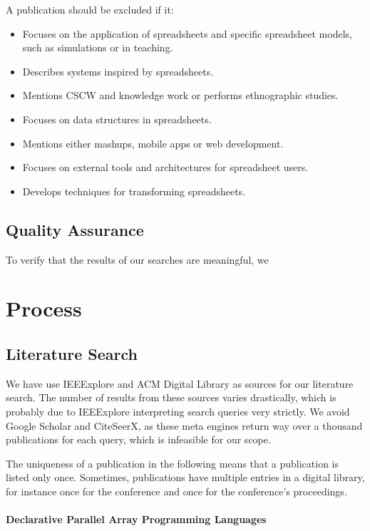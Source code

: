 \documentclass[a4paper]{article}
\begin{document}
A publication should be excluded if it:

\begin{itemize}
\item Focuses on the application of spreadsheets and specific
  spreadsheet models, such as simulations or in teaching.
\item Describes systems inspired by spreadsheets.
\item Mentions CSCW and knowledge work or performs ethnographic
  studies.
\item Focuses on data structures in spreadsheets.
\item Mentions either mashups, mobile apps or web development.
\item Focuses on external tools and architectures for spreadsheet
  users.
\item Develops techniques for transforming spreadsheets.
\end{itemize}

\subsection{Quality Assurance}
\label{sec:quality-assurance}

To verify that the results of our searches are meaningful, we

\section{Process}
\label{sec:process}

\subsection{Literature Search}
\label{sec:literature-search}

We have use IEEExplore and ACM Digital Library as sources for our
literature search. The number of results from these sources varies
drastically, which is probably due to IEEExplore interpreting search
queries very strictly. We avoid Google Scholar and CiteSeerX, as these
meta engines return way over a thousand publications for each query,
which is infeasible for our scope.

The uniqueness of a publication in the following means that a
publication is listed only once. Sometimes, publications have multiple
entries in a digital library, for instance once for the conference and
once for the conference's proceedings.

\paragraph{Declarative Parallel Array Programming Languages}
\end{document}
